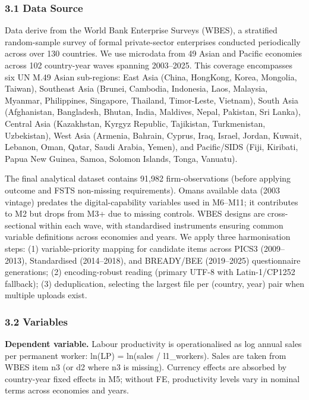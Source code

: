 \documentclass[12pt,a4paper]{article}
\begin{document}
\hypertarget{31-data-source}{%
\subsubsection{3.1 Data Source}\label{31-data-source}}

Data derive from the World Bank Enterprise Surveys (WBES), a stratified
random-sample survey of formal private-sector enterprises conducted
periodically across over 130 countries. We use microdata from 49 Asian
and Pacific economies across 102 country-year waves spanning 2003--2025.
This coverage encompasses six UN M.49 Asian sub-regions: East Asia
(China, HongKong, Korea, Mongolia, Taiwan), Southeast Asia (Brunei,
Cambodia, Indonesia, Laos, Malaysia, Myanmar, Philippines, Singapore,
Thailand, Timor-Leste, Vietnam), South Asia (Afghanistan, Bangladesh,
Bhutan, India, Maldives, Nepal, Pakistan, Sri Lanka), Central Asia
(Kazakhstan, Kyrgyz Republic, Tajikistan, Turkmenistan, Uzbekistan),
West Asia (Armenia, Bahrain, Cyprus, Iraq, Israel, Jordan, Kuwait,
Lebanon, Oman, Qatar, Saudi Arabia, Yemen), and Pacific/SIDS (Fiji,
Kiribati, Papua New Guinea, Samoa, Solomon Islands, Tonga, Vanuatu).

The final analytical dataset contains 91,982 firm-observations (before
applying outcome and FSTS non-missing requirements).
Oman\textquotesingle s available data (2003 vintage) predates the
digital-capability variables used in M6--M11; it contributes to M2 but
drops from M3+ due to missing controls. WBES designs are cross-sectional
within each wave, with standardised instruments ensuring common variable
definitions across economies and years. We apply three harmonisation
steps: (1) variable-priority mapping for candidate items across PICS3
(2009--2013), Standardised (2014--2018), and BREADY/BEE (2019--2025)
questionnaire generations; (2) encoding-robust reading (primary UTF-8
with Latin-1/CP1252 fallback); (3) deduplication, selecting the largest
file per (country, year) pair when multiple uploads exist.

\hypertarget{32-variables}{%
\subsubsection{3.2 Variables}\label{32-variables}}

\textbf{Dependent variable.} Labour productivity is operationalised as
log annual sales per permanent worker: ln(LP) = ln(sales / l1\_workers).
Sales are taken from WBES item n3 (or d2 where n3 is missing). Currency
effects are absorbed by country-year fixed effects in M5; without FE,
productivity levels vary in nominal terms across economies and years.
\end{document}
